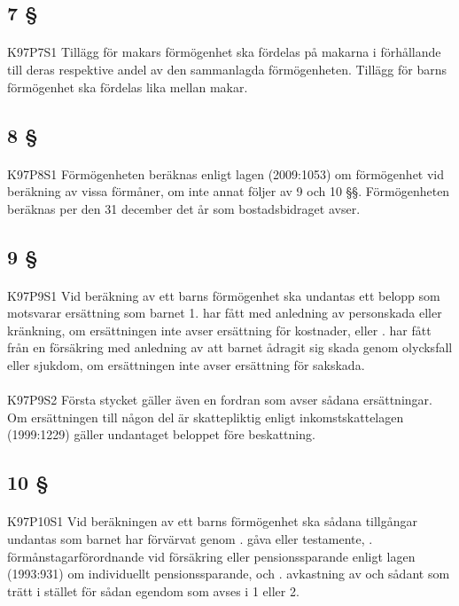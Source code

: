\documentclass[a4paper,notitlepage,openany,10pt]{book}
\begin{document}
\subsection*{7 §}
\paragraph*{}
{\tiny K97P7S1}
Tillägg för makars förmögenhet ska fördelas på makarna i förhållande till deras respektive andel av den sammanlagda förmögenheten.
Tillägg för barns förmögenhet ska fördelas lika mellan makar.
\subsection*{8 §}
\paragraph*{}
{\tiny K97P8S1}
Förmögenheten beräknas enligt lagen (2009:1053) om förmögenhet vid beräkning av vissa förmåner, om inte annat följer av 9 och 10 §§.
Förmögenheten beräknas per den 31 december det år som bostadsbidraget avser.
\subsection*{9 §}
\paragraph*{}
{\tiny K97P9S1}
Vid beräkning av ett barns förmögenhet ska undantas ett belopp som motsvarar ersättning som barnet 1. har fått med anledning av personskada eller kränkning, om ersättningen inte avser ersättning för kostnader, eller
. har fått från en försäkring med anledning av att barnet ådragit sig skada genom olycksfall eller sjukdom, om ersättningen inte avser ersättning för sakskada.
\paragraph*{}
{\tiny K97P9S2}
Första stycket gäller även en fordran som avser sådana ersättningar. Om ersättningen till någon del är skattepliktig enligt inkomstskattelagen (1999:1229) gäller undantaget beloppet före beskattning.
\subsection*{10 §}
\paragraph*{}
{\tiny K97P10S1}
Vid beräkningen av ett barns förmögenhet ska sådana tillgångar undantas som barnet har förvärvat genom
. gåva eller testamente,
. förmånstagarförordnande vid försäkring eller pensionssparande enligt lagen (1993:931) om individuellt pensionssparande, och
. avkastning av och sådant som trätt i stället för sådan egendom som avses i 1 eller 2.
\end{document}
